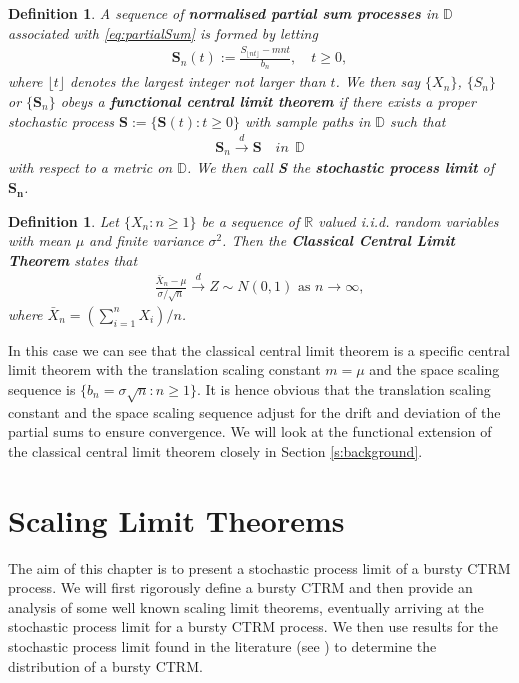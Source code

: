 \documentclass[honours,12pt]{UNSWthesis}
\newcommand{\R}{\mathbb{R}}
\newcommand{\1}{\mathbf 1}
\newcommand{\Floor}[1]{{\lfloor {#1} \rfloor}}
\newcommand{\cd}{\overset{d}{\longrightarrow}}
\newcommand{\D}{\mathbb{D}}
\newtheorem{definition}[theorem]{Definition}
\numberwithin{equation}{section}
\theoremstyle{definition}
\theoremstyle{remark}
\begin{document}
\begin{definition}
	A sequence of \textbf{normalised partial sum processes} in $\D$ associated with \ref{eq:partialSum} is formed by letting
	\begin{align}
		\textbf{S}_n(t):=\frac{S_\Floor{nt}-mnt}{b_n},\quad t\geq 0,
	\end{align}
	where $\lfloor t \rfloor$ denotes the largest integer not larger than $t$. We then say $\{X_n\}$, $\{S_n\}$ or $\{\textbf{S}_n\}$ obeys a \textbf{functional central limit theorem} if there exists a proper stochastic process $\textbf{S}:=\{\textbf{S}(t):t\geq0\}$ with sample paths in $\D$ such that
	\begin{align*}
		\textbf{S}_n \cd \textbf{S}\quad in\ \ \D
	\end{align*}
	with respect to a metric on $\D$. We then call \textbf{S} the \textbf{stochastic process limit} of $\boldsymbol{S_n}$.\\
\end{definition}

\begin{definition}
Let $\{X_n:n\geq1\}$ be a sequence of $\R$ valued i.i.d. random variables with mean $\mu$ and finite variance $\sigma^2$. Then the \textbf{Classical Central Limit Theorem} states that
\begin{align*}
	\frac{\bar{X}_n-\mu}{\sigma/\sqrt{n}} \cd Z \sim N(0,1) \textrm{ as 				$n\to\infty,$}
\end{align*}
where $\bar{X}_n=(\sum^n_{i=1}X_i)/n$.\\
\end{definition}
In this case we can see that the classical central limit theorem is a specific central limit theorem with the translation scaling constant $m=\mu$ and the space scaling sequence is $\{b_n=\sigma\sqrt{n}:n\geq1 \}$. It is hence obvious that the translation scaling constant and the space scaling sequence adjust for the drift and deviation of the partial sums to ensure convergence. We will look at the functional extension of the classical central limit theorem closely in Section \ref{s:background}.

\chapter{Scaling Limit Theorems}
The aim of this chapter is to present a stochastic process limit of a bursty CTRM process. We will first rigorously define a bursty CTRM and then provide an analysis of some well known scaling limit theorems, eventually arriving at the stochastic process limit for a bursty CTRM process. We then use results for the stochastic process limit found in the literature (see \cite{MeerschaertStoev08}) to determine the distribution of a bursty CTRM.
\end{document}
